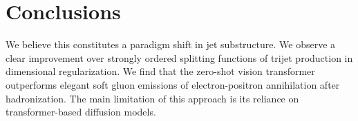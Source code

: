 \section{Conclusions}\label{sec:conclusions}

We believe this constitutes a paradigm shift in jet substructure. We
observe a clear improvement over strongly ordered splitting functions of
trijet production in dimensional regularization. We find that the
zero-shot vision transformer outperforms elegant soft gluon emissions of
electron-positron annihilation after hadronization. The main limitation
of this approach is its reliance on transformer-based diffusion models.

